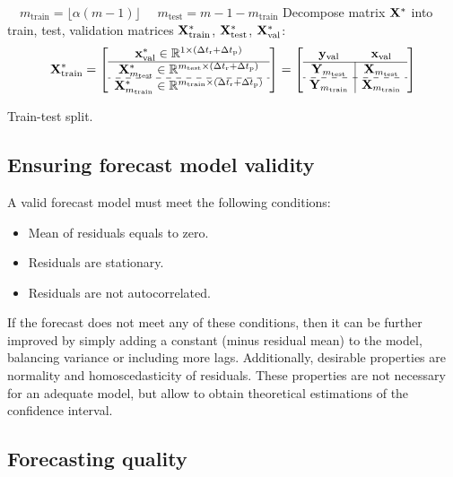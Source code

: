 \documentclass[12pt]{article}
\newcommand{\dtr}{\Delta t_\text{r}}
\newcommand{\dtp}{\Delta t_\text{p}}
\begin{document}
\begin{algorithm}[!h]
 $ \quad m_{\text{train}} = \lfloor\alpha(m-1)\rfloor$ \;
 $ \quad m_{\text{test}} = m - 1 - m_{\text{train}} $ \; %
 Decompose matrix ${\mathbf{X}}^{*}$ into train, test, validation matrices ${\mathbf{X}}^{*}_{\text{train}}$, ${\mathbf{X}}^{*}_{\text{test}}$, ${\mathbf{X}}^{*}_{\text{val}}$:
 \[\bX^{*}_{\text{train}} = \left[\begin{array}{c} \x^{*}_{\text{val}} \in \mathbb{R}^{1\times (\dtr + \dtp)}\\
 \hline
 \bX^{*}_{m_{\text{test}}} \in \mathbb{R}^{m_{\text{test}} \times (\dtr + \dtp)} \\
 \hdashline
 \bX^{*}_{m_{\text{train}}} \in \mathbb{R}^{m_{\text{train}} \times (\dtr + \dtp)} 
 \end{array}\right] = \left[\begin{array}{c|c} \y_{\text{val}} & \x_{\text{val}} \\
 \hline 
 \bY_{m_{\text{test}}} & \bX_{m_{\text{test}}}  \\
 \hdashline
 \bY_{m_{\text{train}}}  & \bX_{m_{\text{train}}}
 \end{array}\right]
 \]
 \caption{Train-test split.}\label{alg:train_test_rmse}
\end{algorithm}

\subsection{Ensuring forecast model validity}
A valid forecast model must meet the following conditions:
\begin{itemize}
\item Mean of residuals equals to zero.
\item Residuals are stationary.
\item Residuals are not autocorrelated.
\end{itemize}
If the forecast does not meet any of these conditions, then it can be further improved by
 simply adding a constant (minus residual mean) to the model, balancing variance or including more lags. Additionally, desirable properties are normality and homoscedasticity of residuals. These properties are not necessary for an adequate model, but allow to obtain theoretical estimations of the confidence interval.

\subsection{Forecasting quality}
\end{document}
